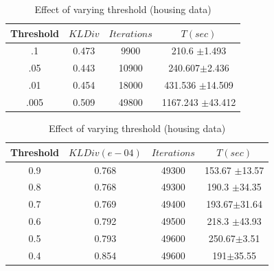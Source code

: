 \documentclass[runningheads,a4paper]{llncs}
\begin{document}


\begin{table}[htdp]
\parbox{.57\linewidth}{
\centering
\begin{tabular}{| c | c | c | c |}
\hline
Threshold & $KL Div$ & $Iterations$ & $T(sec)$  \\
\hline
.1 & 0.473 & 9900 & 210.6 $\pm$1.493 \\
.05 & 0.443 & 10900 & 240.607$\pm$2.436 \\
.01 & 0.454 & 18000 & 431.536 $\pm$14.509 \\
.005 & 0.509 & 49800 & 1167.243 $\pm$43.412 \\
\hline
\end{tabular}
\caption{Effect of varying threshold (REDD)}
\label{table:threshold1}
}
\hfill
\parbox{.57\linewidth}{
\centering
\begin{tabular}{| c | c | c | c |}
\hline
Threshold & $KL Div(e-04)$ & $Iterations$& $T(sec)$ \\
\hline
0.9 & 0.768 & 49300 & 153.67 $\pm$13.57  \\
0.8 & 0.768 & 49300 & 190.3 $\pm$34.35 \\
0.7 & 0.769 & 49400 &  193.67$\pm$31.64  \\
0.6 & 0.792 & 49500 & 218.3 $\pm$43.93  \\
0.5 & 0.793 & 49600 & 250.67$\pm$3.51  \\
0.4 & 0.854 & 49600 & 191$\pm$35.55  \\
\hline
\end{tabular}
\caption{Effect of varying threshold (housing data)}
\label{table:threshold2}
}
\end{table}
\end{document}

